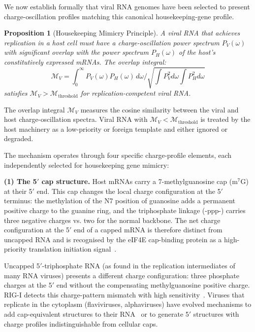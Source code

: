 \documentclass[12pt,a4paper]{article}
\newtheorem{proposition}[theorem]{Proposition}
\theoremstyle{definition}
\theoremstyle{remark}
\begin{document}
We now establish formally that viral RNA genomes have been selected to present charge-oscillation profiles matching this canonical housekeeping-gene profile.

\begin{proposition}[Housekeeping Mimicry Principle]
\label{prop:mimicry}
A viral RNA that achieves replication in a host cell must have a charge-oscillation power spectrum $P_V(\omega)$ with significant overlap with the power spectrum $P_H(\omega)$ of the host's constitutively expressed mRNAs. The overlap integral:
\begin{equation}
  \mathcal{M}_V = \int_0^\infty P_V(\omega) P_H(\omega)\,d\omega \bigg/ \sqrt{\int P_V^2 d\omega \int P_H^2 d\omega}
  \label{eq:overlap}
\end{equation}
satisfies $\mathcal{M}_V > \mathcal{M}_{\mathrm{threshold}}$ for replication-competent viral RNA.
\end{proposition}

The overlap integral $\mathcal{M}_V$ measures the cosine similarity between the viral and host charge-oscillation spectra. Viral RNA with $\mathcal{M}_V < \mathcal{M}_{\mathrm{threshold}}$ is treated by the host machinery as a low-priority or foreign template and either ignored or degraded.

The mechanism operates through four specific charge-profile elements, each independently selected for housekeeping gene mimicry:

\textbf{(1) The 5$'$ cap structure.}
Host mRNAs carry a 7-methylguanosine cap (m$^7$G) at their 5$'$ end. This cap changes the local charge configuration at the 5$'$ terminus: the methylation of the N7 position of guanosine adds a permanent positive charge to the guanine ring, and the triphosphate linkage (-ppp-) carries three negative charges vs. two for the normal backbone. The net charge configuration at the 5$'$ end of a capped mRNA is therefore distinct from uncapped RNA and is recognised by the eIF4E cap-binding protein as a high-priority translation initiation signal~\cite{Sonenberg2009}.

Uncapped 5$'$-triphosphate RNA (as found in the replication intermediates of many RNA viruses) presents a different charge configuration: three phosphate charges at the 5$'$ end without the compensating methylguanosine positive charge. RIG-I detects this charge-pattern mismatch with high sensitivity~\cite{Hornung2006,Pichlmair2006}. Viruses that replicate in the cytoplasm (flaviviruses, alphaviruses) have evolved mechanisms to add cap-equivalent structures to their RNA~\cite{Dong2012} or to generate 5$'$ structures with charge profiles indistinguishable from cellular caps.
\end{document}
